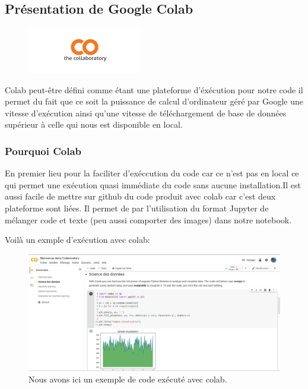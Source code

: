 \subsection{Présentation de Google Colab}

\begin{figure}[h]
\begin{center}
\includegraphics[width=5cm]{./images/Colab_logo.png}
\end{center}
\end{figure}

Colab peut-être défini comme étant une plateforme d'éxécution pour notre code
il permet du fait que ce soit la puissance de calcul d'ordinateur géré par Google une vitesse d'exécution ainsi qu'une vitesse de téléchargement de base de données supérieur à celle qui nous est disponible en local.

\subsubsection{Pourquoi Colab}
En premier lieu pour la faciliter d'exéccution du code car ce n'est pas en local ce qui permet une exécution quasi immédiate du code sans aucune installation.Il est aussi facile de mettre sur github du code produit avec colab car c'est deux plateforme sont liées. Il permet de par l'utilisation du format Jupyter de mélanger code et texte (peu aussi comporter des images) dans notre notebook.

Voilà un exmple d'exécution avec colab:

\begin{figure}[h]
\begin{center}
\includegraphics[width=15cm]{./images/Cap_colab.PNG}
\caption{Nous avons ici un exemple de code exécuté avec colab.}
\end{center}
\end{figure}


